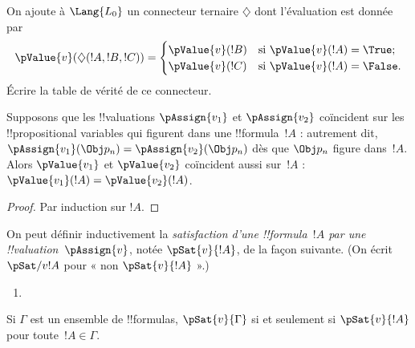 \documentclass[11pt,a4paper,openany]{memoir}
\begin{document}
\begin{prob}
On ajoute à $\Lang{L_0}$ un connecteur ternaire $\diamondsuit$ dont
l'évaluation est donnée par
\begin{gather*}
  \pValue{v}(\diamondsuit( !A , !B , !C ) ) = \begin{cases}
    \pValue{v}( !B ) &
    \text{si $\pValue{v}(!A) = \True$;}\\
    \pValue{v}( !C ) &
    \text{si $\pValue{v}(!A) = \False $}.
  \end{cases}
\end{gather*}
Écrire la table de vérité de ce connecteur.
\end{prob}

\begin{thm}
Supposons que les !!{valuation}s $\pAssign{v_1}$ et $\pAssign{v_2}$
coïncident sur les !!{propositional variable}s qui figurent dans
une !!{formula}~$!A$ : autrement dit,
$\pAssign{v_1}(\Obj p_n) = \pAssign{v_2}(\Obj p_n)$ dès que
$\Obj p_n$ figure dans~$!A$. Alors $\pValue{v_1}$ et $\pValue{v_2}$
coïncident aussi sur~$!A$ :
$\pValue{v_1}(!A) = \pValue{v_2}(!A)$.
\end{thm}

\begin{proof}
Par induction sur $!A$.
\end{proof}

\begin{defn}[Satisfaction]
On peut définir inductivement la \emph{satisfaction d'une
!!{formula}~$!A$ par une !!{valuation}~$\pAssign{v}$},
notée $\pSat{v}{!A}$, de la façon suivante.
(On écrit $\pSat/{v}{!A}$ pour « non $\pSat{v}{!A}$ ».)
\begin{enumerate}


\item {}





\end{enumerate}
Si $\Gamma$ est un ensemble de !!{formula}s, $\pSat{v}{\Gamma}$
si et seulement si $\pSat{v}{!A}$ pour toute~$!A \in \Gamma$.
\end{defn}
\end{document}
